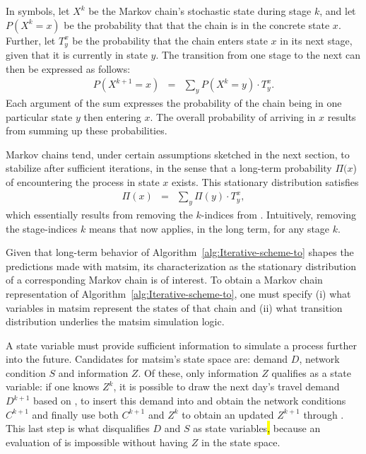 In symbols, let $X^{k}$ be the Markov
chain's stochastic state during stage $k$, and let $P(X^{k}=x)$ be the probability
that that the chain is in the concrete state $x$. Further, let $T_{y}^{x}$
be the probability that the chain enters state $x$ in its next stage,
given that it is currently in state $y$. The transition from one
stage to the next can then be expressed as follows:
\begin{eqnarray}
P(X^{k+1}=x) & = & \sum_{y}P(X^{k}=y)\cdot T_{y}^{x}.\label{eq:one-mc-transition}
\end{eqnarray}
Each argument of the sum expresses the probability of the chain being
in one particular state $y$ then entering $x$. The overall
probability of arriving in $x$ results from summing up these probabilities.

Markov chains tend, under certain assumptions sketched in
the next section, to stabilize after sufficient iterations,
in the sense that a long-term probability $\Pi(x$) of
encountering the process in state $x$ exists. This stationary distribution
satisfies
\begin{eqnarray}
\Pi(x) & = & \sum_{y}\Pi(y)\cdot T_{y}^{x},\label{eq:mc-stationary}
\end{eqnarray}
which essentially results from removing the $k$-indices from .
Intuitively, removing the stage-indices $k$ means that 
now applies, in the long term, for any stage $k$.

Given that long-term behavior of Algorithm~\ref{alg:Iterative-scheme-to}
shapes the predictions made with \gls{matsim}, its characterization as
the stationary distribution of a corresponding Markov chain is
of interest. To obtain a Markov chain representation of Algorithm~\ref{alg:Iterative-scheme-to},
one must specify (i) what variables in \gls{matsim} represent the states
of that chain and (ii) what transition distribution underlies the
\gls{matsim} simulation logic.

A state variable must provide sufficient information to simulate a
process further into the future. Candidates for \gls{matsim}'s state space
are: demand $D$, network condition $S$\corr{}{,} and information
$Z$. Of these, only  information $Z$ qualifies as a state variable:
if one knows $Z^{k}$, it is possible to draw the next day's travel
demand $D^{k+1}$\corr{,}{} based on , to insert this
demand into  and obtain the network
conditions $C^{k+1}$ and finally use both $C^{k+1}$ and $Z^{k}$
to obtain an updated $Z^{k+1}$ through .
This last step is what disqualifies $D$ and $S$ as state variables\hl{,}
because an evaluation of  is impossible
without having $Z$ in the state space.

